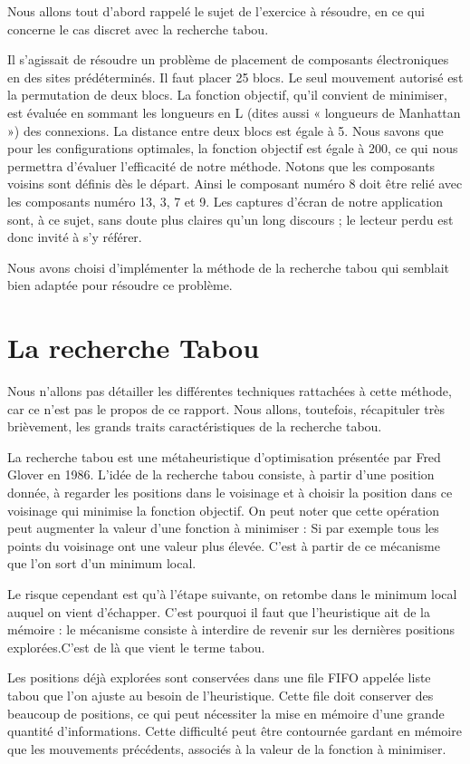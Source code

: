 \documentclass{report}
\begin{document}
Nous allons tout d’abord rappelé le sujet de l’exercice à résoudre, en ce qui concerne
le cas discret avec la recherche tabou.

Il s’agissait de résoudre un problème de placement de composants électroniques
en des sites prédéterminés. Il faut placer 25 blocs. Le seul mouvement autorisé est
la permutation de deux blocs. La fonction objectif, qu’il convient de minimiser, est
évaluée en sommant les longueurs en L (dites aussi « longueurs de Manhattan ») des
connexions. La distance entre deux blocs est égale à 5. Nous savons que pour les
configurations optimales, la fonction objectif est égale à 200, ce qui nous permettra
d’évaluer l’efficacité de notre méthode. Notons que les composants voisins sont définis dès le départ. Ainsi le composant numéro 8 doit être relié avec les composants
numéro 13, 3, 7 et 9. Les captures d’écran de notre application sont, à ce sujet, sans
doute plus claires qu’un long discours ; le lecteur perdu est donc invité à s’y référer.

Nous avons choisi d’implémenter la méthode de la recherche tabou qui semblait bien
adaptée pour résoudre ce problème.

\section{La recherche Tabou}
Nous n’allons pas détailler les différentes techniques rattachées à  cette méthode, car ce n’est pas le
propos de ce rapport. Nous allons, toutefois, récapituler très brièvement, les grands
traits caractéristiques de la recherche tabou.

La recherche tabou est une métaheuristique d'optimisation présentée par Fred Glover en 1986.
L'idée de la recherche tabou consiste, à partir d'une position donnée, à regarder les positions dans le voisinage et à choisir la position dans ce voisinage qui minimise la fonction objectif.
On peut noter que cette opération peut augmenter la valeur d'une fonction à minimiser : Si par exemple tous les points du voisinage ont une valeur plus élevée. C'est à partir de ce mécanisme que l'on sort d'un minimum local.

Le risque cependant est qu'à l'étape suivante, on retombe dans le minimum local auquel on vient d'échapper. C'est pourquoi il faut que l'heuristique ait de la mémoire : le mécanisme consiste à interdire de revenir sur les dernières positions explorées.C'est de là que vient le terme tabou.

Les positions déjà explorées sont conservées dans une file FIFO appelée  liste tabou  que l'on ajuste au besoin de l'heuristique. Cette file doit conserver des beaucoup de positions, ce qui peut  nécessiter la mise en mémoire d'une grande quantité d'informations. Cette difficulté peut être contournée gardant en mémoire que les mouvements précédents, associés à la valeur de la fonction à minimiser.
\end{document}
